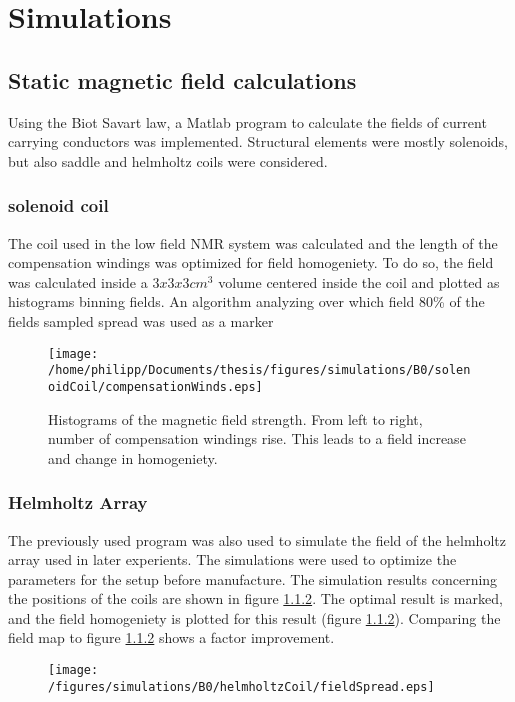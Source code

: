 \section{Simulations}
        \subsection{Static magnetic field calculations}
            Using the Biot Savart law, a Matlab program to calculate the fields of current carrying conductors was implemented. Structural elements were mostly solenoids, but also saddle and helmholtz coils were considered.
            \subsubsection{solenoid coil}
                The coil used in the low field NMR system was calculated and the length of the compensation windings was optimized for field homogeniety. To do so, the field was calculated inside a $3 x 3 x 3 cm^3$ volume centered inside the coil and plotted as histograms binning fields. An algorithm analyzing over which field 80\% of the fields sampled spread was used as a marker
            \begin{figure}[b]
                \centering
                \texttt{[image: /home/philipp/Documents/thesis/figures/simulations/B0/solenoidCoil/compensationWinds.eps]}
                \caption{Histograms of the magnetic field strength. From left to right, number of compensation windings rise. This leads to a field increase and change in homogeniety.}
            \end{figure}
        \subsubsection{Helmholtz Array}
        The previously used program was also used to simulate the field of the helmholtz array used in later experients. The simulations were used to optimize the parameters for the setup before manufacture. The simulation results concerning the positions of the coils are shown in figure \ref{}. The optimal result is marked, and the field homogeniety is plotted for this result (figure \ref{}). Comparing the field map to figure \ref{} shows a factor  improvement.
        \begin{figure}
            \texttt{[image: /figures/simulations/B0/helmholtzCoil/fieldSpread.eps]}
        \end{figure}
%
